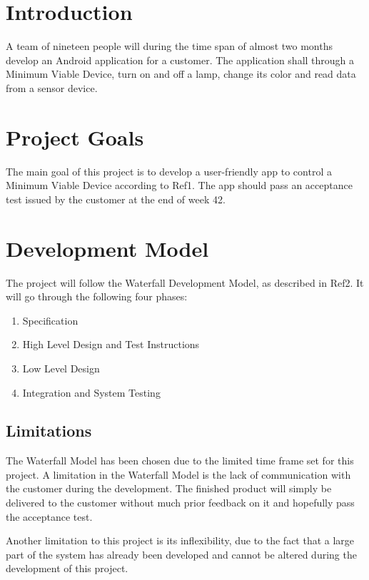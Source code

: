 \documentclass[a4paper]{article}
\begin{document}
\section{Introduction}
A team of nineteen people will during the time span of almost two months develop an Android application for a customer. The application shall through a Minimum Viable Device, turn on and off a lamp, change its color and read data from a sensor device.

\section{Project Goals}
The main goal of this project is to develop a user-friendly app to control a Minimum Viable Device according to  Ref1. The app should pass an acceptance test issued by the customer at the end of week 42. 

\section{Development Model}
The project will follow the Waterfall Development Model, as described in Ref2. It will go through the following four phases:

\begin{enumerate}
\item Specification
\item High Level Design and Test Instructions
\item Low Level Design
\item Integration and System Testing
\end{enumerate}

\subsection{Limitations}
The Waterfall Model has been chosen due to the limited time frame set for this project. A limitation in the Waterfall Model is the lack of communication with the customer during the development. The finished product will simply be delivered to the customer without much prior feedback on it and hopefully pass the acceptance test.

Another limitation to this project is its inflexibility, due to the fact that a large part of the system has already been developed and cannot be altered during the development of this project.
\end{document}
